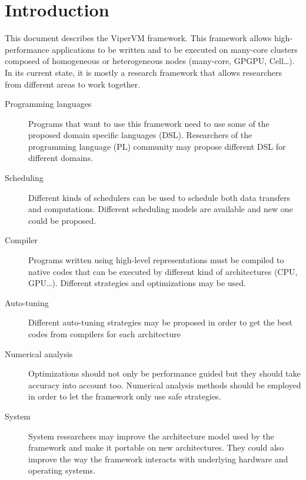 \chapter{Introduction}

This document describes the ViperVM framework.
This framework allows high-performance applications to be written and to be executed on many-core clusters composed of homogeneous or heterogeneous nodes (many-core, GPGPU, Cell\ldots).
In its current state, it is mostly a research framework that allows researchers from different areas to work together.
\begin{description}
  \item[Programming languages] Programs that want to use this framework need to use some of the proposed domain specific languages (DSL).
        Researchers of the programming language (PL) community may propose different DSL for different domains.
  \item[Scheduling] Different kinds of schedulers can be used to schedule both data transfers and computations.
        Different scheduling models are available and new one could be proposed.
  \item[Compiler] Programs written using high-level representations must be compiled to native codes that can be executed by different kind of architectures (CPU, GPU\ldots).
        Different strategies and optimizations may be used.
  \item[Auto-tuning] Different auto-tuning strategies may be proposed in order to get the best codes from compilers for each architecture
  \item[Numerical analysis] Optimizations should not only be performance guided but they should take accuracy into account too.
        Numerical analysis methods should be employed in order to let the framework only use safe strategies.
  \item[System] System researchers may improve the architecture model used by the framework and make it portable on new architectures.
        They could also improve the way the framework interacts with underlying hardware and operating systems.
\end{description}
